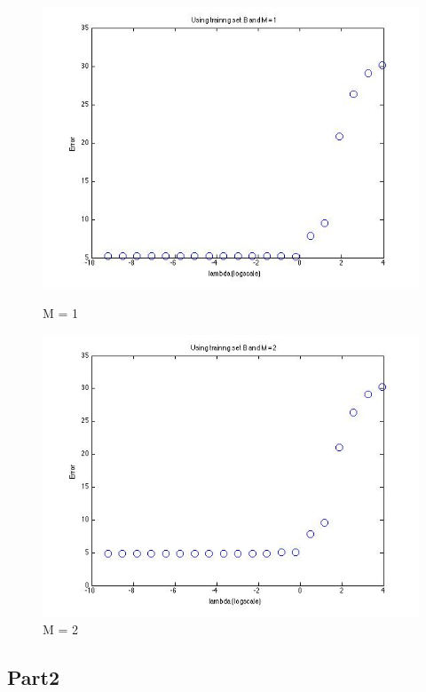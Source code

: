 \begin{figure}[!htb]
                                                                                 \includegraphics[width=\linewidth]{figures/p4_LAD_regressB_m=1}
  \caption{M = 1}
\endminipage\hfill
{}
  \includegraphics[width=\linewidth]{figures/p4_LAD_regressB_m=2}
  \caption{M = 2}
\endminipage\hfill
\end{figure}


\subsection{Part2}

